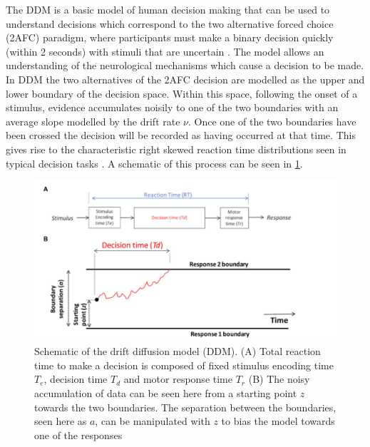 The DDM is a basic model of human decision making that can be used to understand decisions which correspond to the two alternative forced choice (2AFC) paradigm, where participants must make a binary decision quickly (within 2 seconds) with stimuli that are uncertain \cite{ratcliffDiffusionDecisionModel2008, myersPracticalIntroductionUsing2022}. The model allows an understanding of the neurological mechanisms which cause a decision to be made. In DDM the two alternatives of the 2AFC decision are modelled as the upper and lower boundary of the decision space. Within this space, following the onset of a stimulus, evidence accumulates noisily to one of the two boundaries with an average slope modelled by the drift rate $\nu$. Once one of the two boundaries have been crossed the decision will be recorded as having occurred at that time. This gives rise to the characteristic right skewed reaction time distributions seen in typical decision tasks \cite{ratcliffTheoryMemoryRetrieval1978}. A schematic of this process can be seen in \ref{fig:DDM plot}.
\begin{figure}
    \centering
    \includegraphics[width=0.75\linewidth]{figures/DDM.PNG}
    \caption{Schematic of the drift diffusion model (DDM). (A) Total reaction time to make a decision is composed of fixed stimulus encoding time $T_{e}$, decision time $T_{d}$ and motor response time $T_{r}$ (B) The noisy accumulation of data can be seen here from a starting point $z$ towards the two boundaries. The separation between the boundaries, seen here as $a$, can be manipulated with $z$ to bias the model towards one of the responses \cite{myersPracticalIntroductionUsing2022}}
    \label{fig:DDM plot}
\end{figure}

